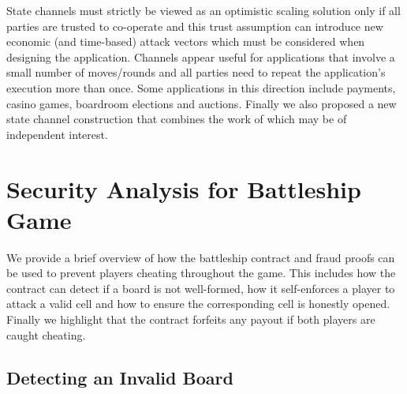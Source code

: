 \documentclass{llncs}
\begin{document}
State channels must strictly be viewed as an optimistic scaling solution only if all parties are trusted to co-operate and this trust assumption can introduce new economic (and time-based) attack vectors which must be considered when designing the application. 
Channels appear useful for applications that involve a small number of moves/rounds and all parties need to repeat the application's execution more than once.  
Some applications in this direction include payments, casino games, boardroom elections and auctions.
Finally we also proposed a new state channel construction that combines the work of \cite{miller2017sprites,mccorry2018pisa,dziembowski2017perun,statechannelnetworks,coleman2018counterfactual} which may be of independent interest. 



%
%




\newpage 
\appendix

\section{Security Analysis for Battleship Game} \label{sec:secanalysis}

We provide a brief overview of how the battleship contract and fraud proofs can be used to prevent players cheating throughout the game. 
This includes how the contract can detect if a board is not well-formed, how it self-enforces a player to attack a valid cell and how to ensure the corresponding cell is honestly opened. 
Finally we highlight that the contract forfeits any payout if both players are caught cheating. 

\subsection{Detecting an Invalid Board}
\end{document}
